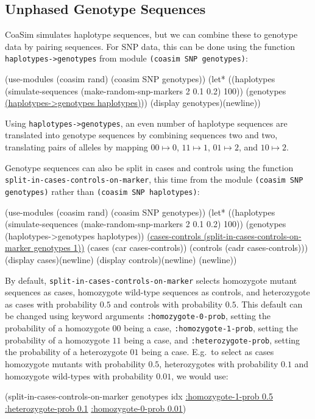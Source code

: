 \documentclass{manual}
\begin{document}
\subsection{Unphased Genotype Sequences}
\label{sec:unph-genotype-sequ}

CoaSim simulates haplotype sequences, but we can combine these to
genotype data by pairing sequences.  For SNP data, this can be done
using the function \texttt{haplotypes->genotypes} from module
\texttt{(coasim SNP genotypes)}:
\begin{code}
(use-modules (coasim rand) (coasim SNP genotypes))
(let* ((haplotypes
          (simulate-sequences (make-random-snp-markers 2 0.1 0.2) 100))
       (genotypes \underline{(haplotypes->genotypes haplotypes)}))
  (display genotypes)(newline))
\end{code}

Using \texttt{haplotypes->genotypes}, an even number of haplotype
sequences are translated into genotype sequences by combining
sequences two and two, translating pairs of alleles by mapping
$00\mapsto 0$, $11\mapsto 1$, $01\mapsto 2$, and $10\mapsto 2$.

Genotype sequences can also be split in cases and controls using the
function \texttt{split-in-cases-controls-on-marker}, this time from the module
\texttt{(coasim SNP genotypes)} rather than \texttt{(coasim SNP haplotypes)}:
\begin{code}
(use-modules (coasim rand) (coasim SNP genotypes))
(let* ((haplotypes
          (simulate-sequences (make-random-snp-markers 2 0.1 0.2) 100))
       (genotypes (haplotypes->genotypes haplotypes))
       \underline{(cases-controls (split-in-cases-controls-on-marker genotypes 1))}
       (cases (car cases-controls))
       (controls (cadr cases-controls)))
  (display cases)(newline)
  (display controls)(newline)
  (newline))
\end{code}

By default, \texttt{split-in-cases-controls-on-marker} selects
homozygote mutant sequences as cases, homozygote wild-type sequences
as controls, and heterozygote as cases with probability $0.5$ and
controls with probability $0.5$.  This default can be changed using
keyword arguments \texttt{:homozygote-0-prob}, setting the probability
of a homozygote $00$ being a case, \texttt{:homozygote-1-prob},
setting the probability of a homozygote $11$ being a case, and
\texttt{:heterozygote-prob}, setting the probability of a heterozygote
$01$ being a case.  E.g.\ to select as cases homozygote mutants with
probability $0.5$, heterozygotes with probability $0.1$ and homozygote
wild-types with probability $0.01$, we would use:
\begin{code}
(split-in-cases-controls-on-marker genotypes idx 
                                   \underline{:homozygote-1-prob 0.5}
                                   \underline{:heterozygote-prob 0.1}
                                   \underline{:homozygote-0-prob 0.01})
\end{code}
\end{document}
